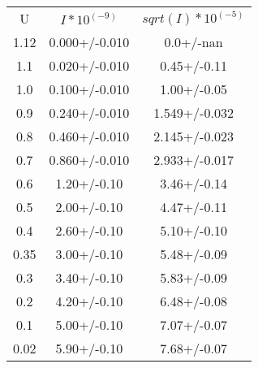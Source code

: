 \begin{table}
\begin{tabular}{ccc}
U & $I*10^(-9)$ & $sqrt(I)*10^(-5)$ \\
1.12 & 0.000+/-0.010 & 0.0+/-nan \\
1.1 & 0.020+/-0.010 & 0.45+/-0.11 \\
1.0 & 0.100+/-0.010 & 1.00+/-0.05 \\
0.9 & 0.240+/-0.010 & 1.549+/-0.032 \\
0.8 & 0.460+/-0.010 & 2.145+/-0.023 \\
0.7 & 0.860+/-0.010 & 2.933+/-0.017 \\
0.6 & 1.20+/-0.10 & 3.46+/-0.14 \\
0.5 & 2.00+/-0.10 & 4.47+/-0.11 \\
0.4 & 2.60+/-0.10 & 5.10+/-0.10 \\
0.35 & 3.00+/-0.10 & 5.48+/-0.09 \\
0.3 & 3.40+/-0.10 & 5.83+/-0.09 \\
0.2 & 4.20+/-0.10 & 6.48+/-0.08 \\
0.1 & 5.00+/-0.10 & 7.07+/-0.07 \\
0.02 & 5.90+/-0.10 & 7.68+/-0.07 \\
\end{tabular}
\end{table}
